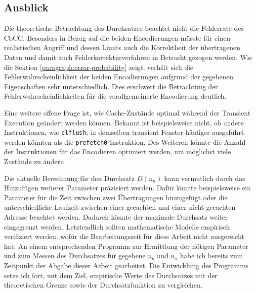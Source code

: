 \subsection{Ausblick}
Die theoretische Betrachtung des Durchsatzes beachtet nicht
die Fehlerrate des \ac{CbCC}. Besonders in Bezug auf die
beiden Encodierungen müsste für einen realistischen Angriff
und dessen Limits auch die Korrektheit der übertragenen Daten
und damit auch Fehlerkorrekturverfahren in Betracht gezogen
werden. Wie die Sektion \ref{paragraph:error-probability} zeigt,
verhält sich die Fehlerwahrscheinlichkeit der beiden Encodierungen
aufgrund der gegebenen Eigenschaften sehr unterschiedlich.
Dies erschwert die Betrachtung der Fehlerwahrscheinlichkeiten
für die verallgemeinerte Encodierung deutlich.

Eine weitere offene Frage ist, wie Cache-Zustände optimal während
der Transient Execution geändert werden können. Bekannt ist
beispielsweise nicht, ob andere Instruktionen, wie
\verb|clflush|, in demselben transient Fenster häufiger
ausgeführt werden könnten als die \verb|prefetch0|-Instruktion.
Des Weiteren könnte die Anzahl der Instruktionen für das
Encodieren optimiert werden, um möglichst viele Zustände zu
ändern.

Die aktuelle Berechnung für den Durchsatz $D(n_a)$ kann
vermutlich durch das Hinzufügen weiterer Parameter
präzisiert werden. Dafür könnte beispielsweise ein Parameter
für die Zeit zwischen zwei Übertragungen hinzugefügt oder
die unterschiedliche Laufzeit zwischen einer gecachten
und einer nicht gecachten Adresse beachtet werden. Dadurch
könnte der maximale Durchsatz weiter eingegrenzt werden.
Letztendlich sollten mathematische Modelle empirisch
verifiziert werden, wofür die Bearbeitungszeit für diese
Arbeit nicht ausgereicht hat. An einem entsprechenden
Programm zur Ermittlung der nötigen Parameter und zum Messen
des Durchsatzes für gegebene $n_b$ und $n_a$ habe ich bereits
zum Zeitpunkt der Abgabe dieser Arbeit gearbeitet. Die
Entwicklung des Programms setze ich fort, mit dem Ziel,
empirische Werte des Durchsatzes mit der theoretischen Grenze
sowie der Durchsatzfunktion zu vergleichen.
